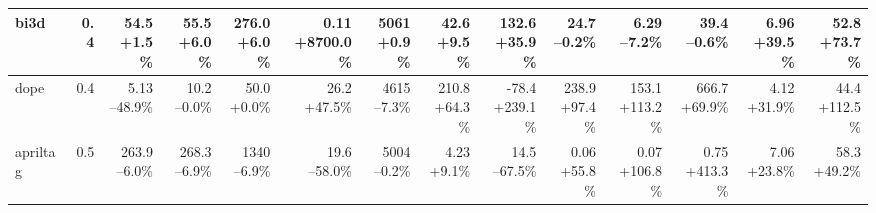 \begin{table}[t]
{\begin{tabular}{lrrrrrrrrrrrrr}
\midrule
bi3d & 0.4 & \makecell[r]{54.5\\+1.5\%} & \makecell[r]{55.5\\+6.0\%} & \makecell[r]{276.0\\+6.0\%} & \makecell[r]{0.11\\+8700.0\%} & \makecell[r]{5061\\+0.9\%} & \makecell[r]{42.6\\+9.5\%} & \makecell[r]{132.6\\+35.9\%} & \makecell[r]{24.7\\--0.2\%} & \makecell[r]{6.29\\--7.2\%} & \makecell[r]{39.4\\--0.6\%} & \makecell[r]{6.96\\+39.5\%} & \makecell[r]{52.8\\+73.7\%} \\
\midrule
dope & 0.4 & \makecell[r]{5.13\\--48.9\%} & \makecell[r]{10.2\\--0.0\%} & \makecell[r]{50.0\\+0.0\%} & \makecell[r]{26.2\\+47.5\%} & \makecell[r]{4615\\--7.3\%} & \makecell[r]{210.8\\+64.3\%} & \makecell[r]{-78.4\\+239.1\%} & \makecell[r]{238.9\\+97.4\%} & \makecell[r]{153.1\\+113.2\%} & \makecell[r]{666.7\\+69.9\%} & \makecell[r]{4.12\\+31.9\%} & \makecell[r]{44.4\\+112.5\%} \\
\midrule
apriltag & 0.5 & \makecell[r]{263.9\\--6.0\%} & \makecell[r]{268.3\\--6.9\%} & \makecell[r]{1340\\--6.9\%} & \makecell[r]{19.6\\--58.0\%} & \makecell[r]{5004\\--0.2\%} & \makecell[r]{4.23\\+9.1\%} & \makecell[r]{14.5\\--67.5\%} & \makecell[r]{0.06\\+55.8\%} & \makecell[r]{0.07\\+106.8\%} & \makecell[r]{0.75\\+413.3\%} & \makecell[r]{7.06\\+23.8\%} & \makecell[r]{58.3\\+49.2\%} \\

\end{tabular}}
\end{table}
